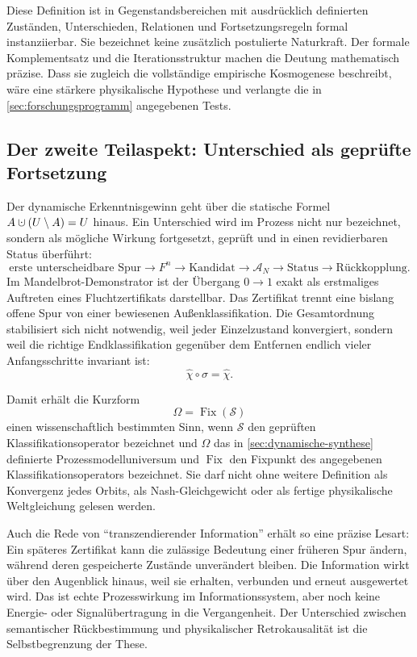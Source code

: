 \documentclass[11pt,a4paper]{article}
\theoremstyle{remark}
\newcommand{\Fix}{\operatorname{Fix}}
\newcommand{\dotcup}{\mathbin{\mathaccent\cdot\cup}}
\begin{document}
Diese Definition ist in Gegenstandsbereichen mit ausdrücklich definierten
Zuständen, Unterschieden, Relationen und Fortsetzungsregeln formal
instanziierbar. Sie bezeichnet keine zusätzlich postulierte Naturkraft. Der
formale Komplementsatz und die Iterationsstruktur machen die Deutung
mathematisch präzise. Dass sie zugleich die vollständige empirische Kosmogenese
beschreibt, wäre eine stärkere physikalische Hypothese und verlangte die in
\cref{sec:forschungsprogramm} angegebenen Tests.

\subsection{Der zweite Teilaspekt: Unterschied als geprüfte Fortsetzung}

Der dynamische Erkenntnisgewinn geht über die statische Formel
\(A\dotcup(U\setminus A)=U\) hinaus. Ein Unterschied wird im Prozess nicht
nur bezeichnet, sondern als mögliche Wirkung fortgesetzt, geprüft und in
einen revidierbaren Status überführt:
\[
\boxed{
\text{erste unterscheidbare Spur}
\longrightarrow F^n
\longrightarrow\text{Kandidat}
\longrightarrow\mathcal A_N
\longrightarrow\text{Status}
\longrightarrow\text{Rückkopplung}.}
\]
Im Mandelbrot-Demonstrator ist der Übergang \(0\to1\) exakt als erstmaliges
Auftreten eines Fluchtzertifikats darstellbar. Das Zertifikat trennt eine
bislang offene Spur von einer bewiesenen Außenklassifikation. Die
Gesamtordnung stabilisiert sich nicht notwendig, weil jeder Einzelzustand
konvergiert, sondern weil die richtige Endklassifikation gegenüber dem
Entfernen endlich vieler Anfangsschritte invariant ist:
\[
  \widehat\chi\circ\sigma=\widehat\chi.
\]

Damit erhält die Kurzform
\[
  \Omega=\Fix(\mathcal S)
\]
einen wissenschaftlich bestimmten Sinn, wenn \(\mathcal S\) den geprüften
Klassifikationsoperator bezeichnet und \(\Omega\) das in
\cref{sec:dynamische-synthese} definierte Prozessmodelluniversum und
\(\Fix\) den Fixpunkt des angegebenen Klassifikationsoperators bezeichnet.
Sie darf nicht ohne weitere Definition als Konvergenz jedes Orbits, als
Nash-Gleichgewicht oder als fertige physikalische Weltgleichung gelesen
werden.

Auch die Rede von ``transzendierender Information'' erhält so eine präzise
Lesart: Ein späteres Zertifikat kann die zulässige Bedeutung einer früheren
Spur ändern, während deren gespeicherte Zustände unverändert bleiben. Die
Information wirkt über den Augenblick hinaus, weil sie erhalten, verbunden
und erneut ausgewertet wird. Das ist echte Prozesswirkung im
Informationssystem, aber noch keine Energie- oder Signalübertragung in die
Vergangenheit. Der Unterschied zwischen semantischer Rückbestimmung und
physikalischer Retrokausalität ist die Selbstbegrenzung der These.
\end{document}
